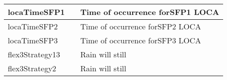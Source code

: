 \begin{table}
\begin{center}
\begin{tabular}{ | l | p{5cm} | p{5cm} |}
        locaTimeSFP1       &              & Time of occurrence forSFP1 LOCA   \\ \hline
        locaTimeSFP2       &              & Time of occurrence forSFP2 LOCA  \\ \hline
        locaTimeSFP3       &              & Time of occurrence forSFP3 LOCA   \\ \hline
        flex3Strategy13    &              & Rain will still   \\ \hline
        flex3Strategy2     &              & Rain will still   \\ 
        \hline
      \end{tabular}
  \end{center}
  \label{tab:stochasticParameters}
\end{table}



